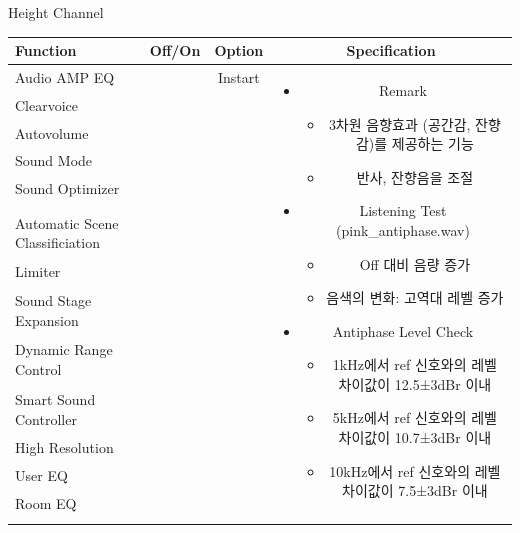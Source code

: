 \documentclass{beamer}
\begin{document}
	
	\begin{frame}[t]{Height Channel}
		\begin{tiny}
			\begin{tabular}{@{}lccc@{}}
				\toprule
				Function & Off/On & Option & Specification \\
				\midrule
				Audio AMP EQ & \color{black}{Off} & Instart &
				\multirow{14}{60mm}{
					\begin{itemize}
						\item Remark
						\begin{itemize}
							\item 3차원 음향효과 (공간감, 잔향감)를 제공하는 기능
							\item 반사, 잔향음을 조절
						\end{itemize}
						\item Listening Test (pink\_antiphase.wav)
						\begin{itemize}
							\item Off 대비 음량 증가
							\item 음색의 변화: 고역대 레벨 증가
						\end{itemize}
						\item Antiphase Level Check
						\begin{itemize}
							\item 1kHz에서 ref 신호와의 레벨 차이값이 12.5±3dBr 이내
							\item 5kHz에서 ref 신호와의 레벨 차이값이 10.7±3dBr 이내
							\item 10kHz에서 ref 신호와의 레벨 차이값이 7.5±3dBr 이내
						\end{itemize}
					\end{itemize}
				} \\
				Clearvoice & \color{black}{Off} & & \\
				Autovolume & \color{black}{Off} & & \\
				Sound Mode & \color{black}{Off} & & \\
				Sound Optimizer & \color{black}{Off} & & \\
				\color{blue}{Height Channel} & \color{blue}{On} & & \\
				Automatic Scene Classificiation & \color{black}{Off} & & \\
				Limiter & \color{black}{Off} & & \\
				Sound Stage Expansion & \color{black}{Off} & & \\
				Dynamic Range Control & \color{black}{Off} & & \\
				Smart Sound Controller & \color{black}{Off} & & \\
				High Resolution & \color{black}{Off} & & \\
				User EQ & \color{black}{Off} & & \\
				Room EQ & \color{black}{Off} & & \\
				\color{blue}{OSD Volume} & \color{blue}{On} &  \color{blue}{Vol.40} & \\
				\midrule
			\end{tabular}
		\end{tiny}
		
	\end{frame}
	
\end{document}
